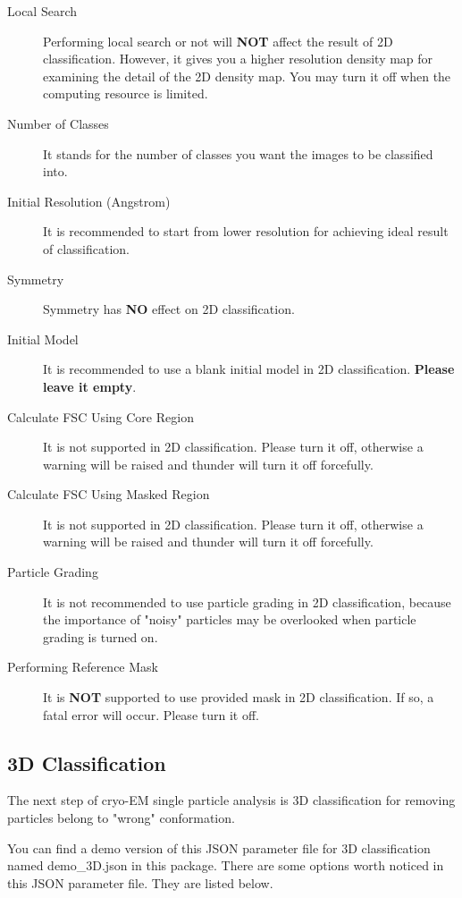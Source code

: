 \documentclass{article}
\begin{document}
        \begin{description}
            \item[Local Search] Performing local search or not will \textbf{NOT} affect the result of 2D classification. However, it gives you a higher resolution density map for examining the detail of the 2D density map. You may turn it off when the computing resource is limited.
            \item[Number of Classes] It stands for the number of classes you want the images to be classified into.
            \item[Initial Resolution (Angstrom)] It is recommended to start from lower resolution for achieving ideal result of classification.
            \item[Symmetry] Symmetry has \textbf{NO} effect on 2D classification.
            \item[Initial Model] It is recommended to use a blank initial model in 2D classification. \textbf{Please leave it empty}.
            \item[Calculate FSC Using Core Region] It is not supported in 2D classification. Please turn it off, otherwise a warning will be raised and \textsf{thunder} will turn it off forcefully.
            \item[Calculate FSC Using Masked Region] It is not supported in 2D classification. Please turn it off, otherwise a warning will be raised and \textsf{thunder} will turn it off forcefully.
            \item[Particle Grading] It is not recommended to use particle grading in 2D classification, because the importance of "noisy" particles may be overlooked when particle grading is turned on.
            \item[Performing Reference Mask] It is \textbf{NOT} supported to use provided mask in 2D classification. If so, a fatal error will occur. Please turn it off.
        \end{description}
        
        \subsection{3D Classification}
           
        The next step of cryo-EM single particle analysis is 3D classification for removing particles belong to "wrong" conformation.
                
        You can find a demo version of this JSON parameter file for 3D classification named \textsf{demo\_3D.json} in this package. There are some options worth noticed in this JSON parameter file. They are listed below.
        
\end{document}
